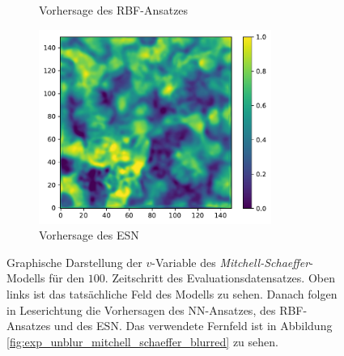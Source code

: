 \begin{appendices}
\begin{figure}[h]
\begin{subfigure}{.5\textwidth}
		\setcapmargin[1cm]{0.5cm}
  		\caption{Vorhersage des \textsc{RBF}-Ansatzes}
  		\label{fig:apx_unblur_mitchell_result_rbf_pred}
	\end{subfigure}%
	\begin{subfigure}{.5\textwidth}
		\centering
		\includegraphics[height=2.5in]{figures/results/unblur/esn_mitchell_v_blur_pred.pdf}
		\setcapmargin[1cm]{0.5cm}
  		\caption{Vorhersage des \textsc{ESN}}
  		\label{fig:apx_unblur_mitchell_result_esn_pred}
	\end{subfigure}
	\caption{Graphische Darstellung der $v$-Variable des \textit{Mitchell-Schaeffer}-Modells für den $100$. Zeitschritt des Evaluationsdatensatzes. Oben links ist das tatsächliche Feld des Modells zu sehen. Danach folgen in Leserichtung die Vorhersagen des \textsc{NN}-Ansatzes, des \textsc{RBF}-Ansatzes und des \textsc{ESN}. Das verwendete Fernfeld ist in Abbildung \ref{fig:exp_unblur_mitchell_schaeffer_blurred} zu sehen.}
	\label{fig:apx_unblur_mitchell_result}
\end{figure} 


\end{appendices}
